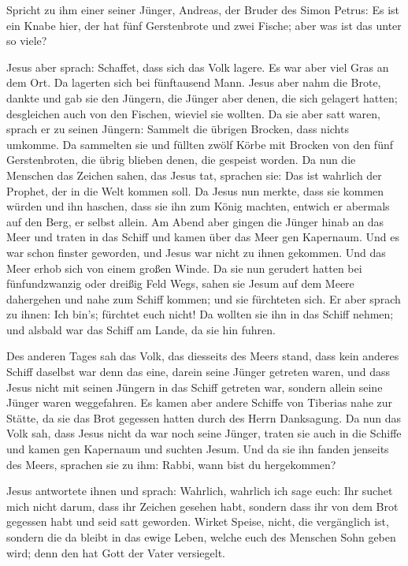  Spricht zu ihm einer seiner Jünger, Andreas, der Bruder
des Simon Petrus:  Es ist ein Knabe hier, der hat fünf
Gerstenbrote und zwei Fische; aber was ist das unter so viele?

 Jesus aber sprach: Schaffet, dass sich das Volk lagere.
Es war aber viel Gras an dem Ort. Da lagerten sich bei fünftausend Mann.
 Jesus aber nahm die Brote, dankte und gab sie den
Jüngern, die Jünger aber denen, die sich gelagert hatten; desgleichen
auch von den Fischen, wieviel sie wollten.  Da sie aber
satt waren, sprach er zu seinen Jüngern: Sammelt die übrigen Brocken,
dass nichts umkomme.  Da sammelten sie und füllten zwölf
Körbe mit Brocken von den fünf Gerstenbroten, die übrig blieben denen,
die gespeist worden.  Da nun die Menschen das Zeichen
sahen, das Jesus tat, sprachen sie: Das ist wahrlich der Prophet, der in
die Welt kommen soll.  Da Jesus nun merkte, dass sie
kommen würden und ihn haschen, dass sie ihn zum König machten, entwich
er abermals auf den Berg, er selbst allein.  Am Abend
aber gingen die Jünger hinab an das Meer  und traten in
das Schiff und kamen über das Meer gen Kapernaum. Und es war schon
finster geworden, und Jesus war nicht zu ihnen gekommen. 
Und das Meer erhob sich von einem großen Winde.  Da sie
nun gerudert hatten bei fünfundzwanzig oder dreißig Feld Wegs, sahen sie
Jesum auf dem Meere dahergehen und nahe zum Schiff kommen; und sie
fürchteten sich.  Er aber sprach zu ihnen: Ich bin's;
fürchtet euch nicht!  Da wollten sie ihn in das Schiff
nehmen; und alsbald war das Schiff am Lande, da sie hin fuhren.

 Des anderen Tages sah das Volk, das diesseits des Meers
stand, dass kein anderes Schiff daselbst war denn das eine, darein seine
Jünger getreten waren, und dass Jesus nicht mit seinen Jüngern in das
Schiff getreten war, sondern allein seine Jünger waren weggefahren.
 Es kamen aber andere Schiffe von Tiberias nahe zur
Stätte, da sie das Brot gegessen hatten durch des Herrn Danksagung.
 Da nun das Volk sah, dass Jesus nicht da war noch seine
Jünger, traten sie auch in die Schiffe und kamen gen Kapernaum und
suchten Jesum.  Und da sie ihn fanden jenseits des Meers,
sprachen sie zu ihm: Rabbi, wann bist du hergekommen?

 Jesus antwortete ihnen und sprach: Wahrlich, wahrlich
ich sage euch: Ihr suchet mich nicht darum, dass ihr Zeichen gesehen
habt, sondern dass ihr von dem Brot gegessen habt und seid satt
geworden.  Wirket Speise, nicht, die vergänglich ist,
sondern die da bleibt in das ewige Leben, welche euch des Menschen Sohn
geben wird; denn den hat Gott der Vater versiegelt.


